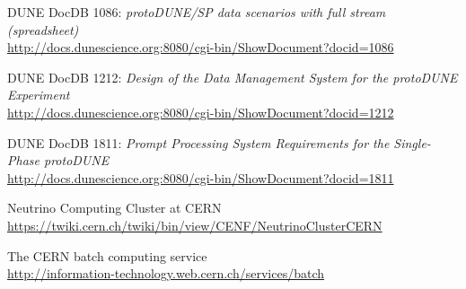 \documentclass[pdftex,12pt,letter]{article}
\begin{document}
\begin{thebibliography}{1}
{DUNE DocDB 1086: \textit{ protoDUNE/SP data scenarios with full stream (spreadsheet)}}\\
\url{http://docs.dunescience.org:8080/cgi-bin/ShowDocument?docid=1086}





{DUNE DocDB 1212: \textit{Design of the Data Management System for the protoDUNE Experiment}}\\
\url{http://docs.dunescience.org:8080/cgi-bin/ShowDocument?docid=1212}

{DUNE DocDB 1811: \textit{Prompt Processing System Requirements for the Single-Phase protoDUNE}}\\
\url{http://docs.dunescience.org:8080/cgi-bin/ShowDocument?docid=1811}

{Neutrino Computing Cluster at CERN}\\
\url{https://twiki.cern.ch/twiki/bin/view/CENF/NeutrinoClusterCERN}

{The CERN batch computing service}\\
\url{http://information-technology.web.cern.ch/services/batch}

\end{thebibliography}
\end{document}
